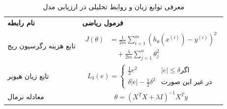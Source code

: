 \begin{table}[H]
	\centering
	\caption{معرفی توابع زیان و روابط تحلیلی در ارزیابی مدل}
	\label{tbl}
	\renewcommand{\arraystretch}{1.5}
	\setlength{\arrayrulewidth}{0.8pt}
	\setlength{\tabcolsep}{10pt}
	
	\begin{tabular}{
			|>{\centering\arraybackslash}m{4cm}
			!{\color{blue}\vrule width 2pt}
			>{\centering\arraybackslash}m{10cm}|
		}
		\hline
		\textbf{نام رابطه} & \textbf{فرمول ریاضی}
		\vspace{0.1cm} \\
		\Xhline{3pt}
		
		تابع هزینه رگرسیون ریج
		&
		\begin{minipage}{9.5cm}
			\vspace{0.2cm}
			\begin{equation}
				\begin{aligned}
					J(\theta) &= \frac{1}{2m} \sum_{i=1}^{m}
					\left( h_\theta(x^{(i)}) - y^{(i)} \right)^2 \\
					&\quad + \frac{\lambda}{2m} \sum_{j=1}^{n} \theta_j^2
				\end{aligned}
				\label{eq11}
			\end{equation}
			\vspace{0.2cm}
		\end{minipage}
		\\
		\hline
		
		تابع زیان هیوبر
		&
		\begin{minipage}{9.5cm}
			\vspace{0.2cm}
			\begin{equation}
				L_\delta(e) =
				\begin{cases}
					\frac{1}{2} e^2 &  |e| \le \delta \text{اگر }\\
					\delta |e| - \frac{1}{2}\delta^2 & \text{در غیر این صورت}
				\end{cases}
				\label{eq12}
			\end{equation}
			\vspace{0.2cm}
		\end{minipage}
		\\
		\hline
		
		معادله نرمال
		&
		\begin{minipage}{9.5cm}
			\vspace{0.2cm}
			\begin{equation}
				\theta =
				\left( X^T X + \lambda I \right)^{-1} X^T y
				\label{eq13}
			\end{equation}
			\vspace{-0.4cm}
		\end{minipage}
		\\
		\hline
	\end{tabular}
\end{table}

